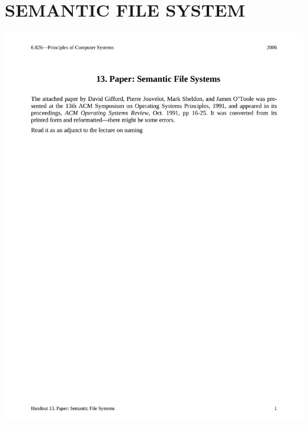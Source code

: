 \section{SEMANTIC FILE SYSTEM}
\hspace*{-1.5cm}
\includegraphics[page=1,scale=0.75]{./appendix/SEMFS.pdf}



